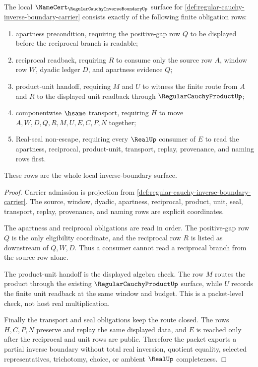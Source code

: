 \begin{theorem}
\label{thm:regular-cauchy-inverse-boundary-namecert-obligations}
The local $\NameCert_{\RegularCauchyInverseBoundaryUp}$ surface for \autoref{def:regular-cauchy-inverse-boundary-carrier} consists exactly of the following finite obligation rows:
\begin{enumerate}
\item apartness precondition, requiring the positive-gap row $Q$ to be displayed before the reciprocal branch is readable;
\item reciprocal readback, requiring $R$ to consume only the source row $A$, window row $W$, dyadic ledger $D$, and apartness evidence $Q$;
\item product-unit handoff, requiring $M$ and $U$ to witness the finite route from $A$ and $R$ to the displayed unit readback through $\RegularCauchyProductUp$;
\item componentwise $\hsame$ transport, requiring $H$ to move $A,W,D,Q,R,M,U,E,C,P,N$ together;
\item Real-seal non-escape, requiring every $\RealUp$ consumer of $E$ to read the apartness, reciprocal, product-unit, transport, replay, provenance, and naming rows first.
\end{enumerate}
These rows are the whole local inverse-boundary surface.
\end{theorem}
\begin{proof}
Carrier admission is projection from \autoref{def:regular-cauchy-inverse-boundary-carrier}. The source, window, dyadic, apartness, reciprocal, product, unit, seal, transport, replay, provenance, and naming rows are explicit coordinates.

The apartness and reciprocal obligations are read in order. The positive-gap row $Q$ is the only eligibility coordinate, and the reciprocal row $R$ is listed as downstream of $Q,W,D$. Thus a consumer cannot read a reciprocal branch from the source row alone.

The product-unit handoff is the displayed algebra check. The row $M$ routes the product through the existing $\RegularCauchyProductUp$ surface, while $U$ records the finite unit readback at the same window and budget. This is a packet-level check, not host real multiplication.

Finally the transport and seal obligations keep the route closed. The rows $H,C,P,N$ preserve and replay the same displayed data, and $E$ is reached only after the reciprocal and unit rows are public. Therefore the packet exports a partial inverse boundary without total real inversion, quotient equality, selected representatives, trichotomy, choice, or ambient $\RealUp$ completeness.
\end{proof}

